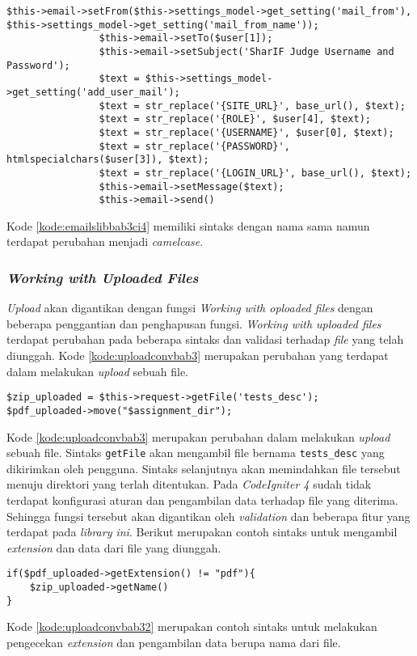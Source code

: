 \begin{lstlisting}[caption=Contoh perubahan \textit{library emails}, label=kode:emailslibbab3ci4]
$this->email->setFrom($this->settings_model->get_setting('mail_from'), $this->settings_model->get_setting('mail_from_name'));
				$this->email->setTo($user[1]);
				$this->email->setSubject('SharIF Judge Username and Password');
				$text = $this->settings_model->get_setting('add_user_mail');
				$text = str_replace('{SITE_URL}', base_url(), $text);
				$text = str_replace('{ROLE}', $user[4], $text);
				$text = str_replace('{USERNAME}', $user[0], $text);
				$text = str_replace('{PASSWORD}', htmlspecialchars($user[3]), $text);
				$text = str_replace('{LOGIN_URL}', base_url(), $text);
				$this->email->setMessage($text);
				$this->email->send()
\end{lstlisting}

Kode \ref{kode:emailslibbab3ci4} memiliki sintaks dengan nama sama namun terdapat perubahan menjadi \textit{camelcase}.

\subsubsection{\textit{Working with Uploaded Files}}
\textit{Upload} akan digantikan dengan fungsi \textit{Working with oploaded files} dengan beberapa penggantian dan penghapusan fungsi. \textit{Working with uploaded files} terdapat perubahan pada beberapa sintaks dan validasi terhadap \textit{file} yang telah diunggah. Kode \ref{kode:uploadconvbab3} merupakan perubahan yang terdapat dalam melakukan \textit{upload} sebuah file.

\begin{lstlisting}[caption=Contoh perubahan \textit{library upload}, label=kode:uploadconvbab3]
$zip_uploaded = $this->request->getFile('tests_desc');
$pdf_uploaded->move("$assignment_dir");
\end{lstlisting}

Kode \ref{kode:uploadconvbab3} merupakan perubahan dalam melakukan \textit{upload} sebuah file. Sintaks \texttt{getFile} akan mengambil file bernama \texttt{tests\_desc} yang dikirimkan oleh pengguna. Sintaks selanjutnya akan memindahkan file tersebut menuju direktori yang terlah ditentukan. Pada \textit{CodeIgniter 4} sudah tidak terdapat konfigurasi aturan dan pengambilan data terhadap file yang diterima. Sehingga fungsi tersebut akan digantikan oleh \textit{validation} dan beberapa fitur yang terdapat pada \textit{library ini}. Berikut merupakan contoh sintaks untuk mengambil \textit{extension} dan data dari file yang diunggah.
\begin{lstlisting}[caption=Contoh sintaks untuk mengambil \textit{extension} dan data file, label=kode:uploadconvbab32]
if($pdf_uploaded->getExtension() != "pdf"){
	$zip_uploaded->getName()
}
\end{lstlisting}
Kode \ref{kode:uploadconvbab32} merupakan contoh sintaks untuk melakukan pengecekan \textit{extension} dan pengambilan data berupa nama dari file.

